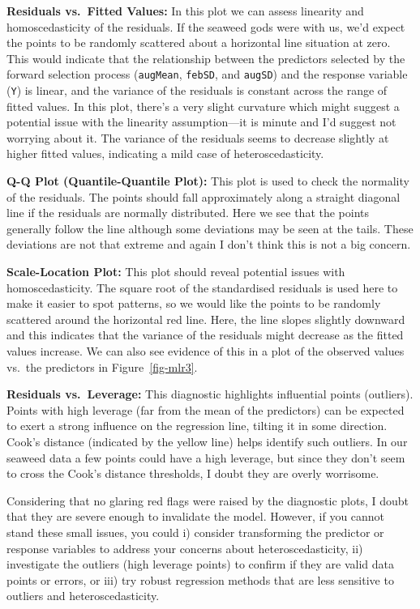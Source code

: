 \documentclass[
  letterpaper,
]{book}
\begin{document}
\textbf{Residuals vs.~Fitted Values:} In this plot we can assess
linearity and homoscedasticity of the residuals. If the seaweed gods
were with us, we'd expect the points to be randomly scattered about a
horizontal line situation at zero. This would indicate that the
relationship between the predictors selected by the forward selection
process (\texttt{augMean}, \texttt{febSD}, and \texttt{augSD}) and the
response variable (\texttt{Y}) is linear, and the variance of the
residuals is constant across the range of fitted values. In this plot,
there's a very slight curvature which might suggest a potential issue
with the linearity assumption---it is minute and I'd suggest not
worrying about it. The variance of the residuals seems to decrease
slightly at higher fitted values, indicating a mild case of
heteroscedasticity.

\textbf{Q-Q Plot (Quantile-Quantile Plot):} This plot is used to check
the normality of the residuals. The points should fall approximately
along a straight diagonal line if the residuals are normally
distributed. Here we see that the points generally follow the line
although some deviations may be seen at the tails. These deviations are
not that extreme and again I don't think this is not a big concern.

\textbf{Scale-Location Plot:} This plot should reveal potential issues
with homoscedasticity. The square root of the standardised residuals is
used here to make it easier to spot patterns, so we would like the
points to be randomly scattered around the horizontal red line. Here,
the line slopes slightly downward and this indicates that the variance
of the residuals might decrease as the fitted values increase. We can
also see evidence of this in a plot of the observed values vs.~the
predictors in Figure~\ref{fig-mlr3}.

\textbf{Residuals vs.~Leverage:} This diagnostic highlights influential
points (outliers). Points with high leverage (far from the mean of the
predictors) can be expected to exert a strong influence on the
regression line, tilting it in some direction. Cook's distance
(indicated by the yellow line) helps identify such outliers. In our
seaweed data a few points could have a high leverage, but since they
don't seem to cross the Cook's distance thresholds, I doubt they are
overly worrisome.

Considering that no glaring red flags were raised by the diagnostic
plots, I doubt that they are severe enough to invalidate the model.
However, if you cannot stand these small issues, you could i) consider
transforming the predictor or response variables to address your
concerns about heteroscedasticity, ii) investigate the outliers (high
leverage points) to confirm if they are valid data points or errors, or
iii) try robust regression methods that are less sensitive to outliers
and heteroscedasticity.
\end{document}
